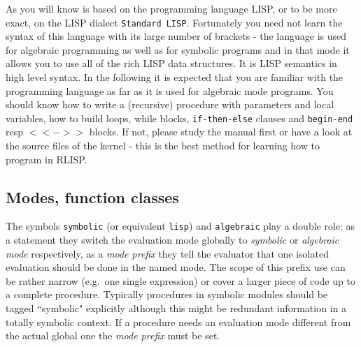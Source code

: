 As you will know {\reduce} is based on the programming
language LISP, or to be more exact, on the LISP dialect
{\tt Standard LISP}. Fortunately
 
you need not learn the syntax of this language with its
large number of brackets - the {\reduce}
language is used for algebraic programming as well as
for symbolic programs and in that mode it allows you to
use all of the rich LISP data structures. It is LISP
semantics in high level {\reduce} syntax. In the following
it is expected that you are familiar with the {\reduce}
programming language as far as it is used for algebraic
mode programs. You should know how to write a (recursive) procedure
with parameters and local variables, how to build loops,
while blocks, {\tt if-then-else} clauses and {\tt begin-end} resp $<< - >>$
blocks. If not, please study the {\reduce} manual first
or have a look at the source files of the {\reduce}
kernel - this is the best method for learning how to
program in RLISP.

\subsection{Modes, function classes}

The symbols {\tt symbolic} (or equivalent {\tt lisp})
 
and {\tt algebraic} 
 play a double role: as a statement
they switch the evaluation mode globally to {\em symbolic}
or {\em algebraic mode} respectively, as a {\em mode prefix} 
 they tell the
{\reduce} evaluator that one isolated evaluation should
be done in the named mode. The scope of this prefix use
can be rather narrow (e.g.\ one single expression) or
cover a larger piece of code up to a complete procedure.
Typically procedures in symbolic modules should be tagged
``symbolic" explicitly although this might be redundant
information in a totally symbolic context. If a procedure
needs an evaluation mode different from the actual global
one the {\em mode prefix} must be set.

